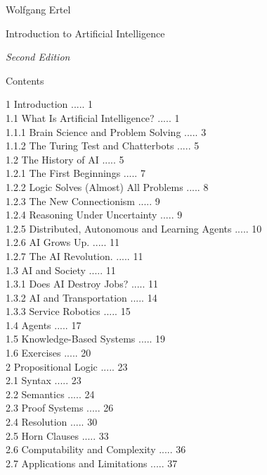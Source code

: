 \documentclass[10pt]{book}
\begin{document}
\begin{titlepage}
\centering
Wolfgang Ertel

\vspace{1em}
{\LARGE Introduction to Artificial Intelligence\par}

\vspace{1em}
\textit{Second Edition}
\end{titlepage}

\tableofcontents

Contents

1 Introduction ..... 1\\
1.1 What Is Artificial Intelligence? ..... 1\\
1.1.1 Brain Science and Problem Solving ..... 3\\
1.1.2 The Turing Test and Chatterbots ..... 5\\
1.2 The History of AI ..... 5\\
1.2.1 The First Beginnings ..... 7\\
1.2.2 Logic Solves (Almost) All Problems ..... 8\\
1.2.3 The New Connectionism ..... 9\\
1.2.4 Reasoning Under Uncertainty ..... 9\\
1.2.5 Distributed, Autonomous and Learning Agents ..... 10\\
1.2.6 AI Grows Up. ..... 11\\
1.2.7 The AI Revolution. ..... 11\\
1.3 AI and Society ..... 11\\
1.3.1 Does AI Destroy Jobs? ..... 11\\
1.3.2 AI and Transportation ..... 14\\
1.3.3 Service Robotics ..... 15\\
1.4 Agents ..... 17\\
1.5 Knowledge-Based Systems ..... 19\\
1.6 Exercises ..... 20\\
2 Propositional Logic ..... 23\\
2.1 Syntax ..... 23\\
2.2 Semantics ..... 24\\
2.3 Proof Systems ..... 26\\
2.4 Resolution ..... 30\\
2.5 Horn Clauses ..... 33\\
2.6 Computability and Complexity ..... 36\\
2.7 Applications and Limitations ..... 37\\
\end{document}
